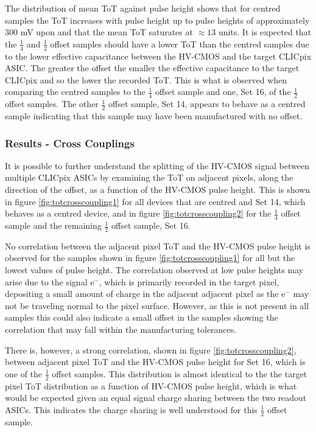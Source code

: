 The distribution of mean ToT against pulse height shows that for centred samples the ToT increases with pulse height up to pulse heights of approximately 300 mV upon and that the mean ToT saturates at $\approx 13$ units.  It is expected that the $\frac{1}{4}$ and $\frac{1}{2}$ offset samples should have a lower ToT than the centred samples due to the lower effective capacitance between the HV-CMOS and the target CLICpix ASIC.  The greater the offset the smaller the effective capacitance to the target CLICpix and so the lower the recorded ToT.  This is what is observed when comparing the centred samples to the $\frac{1}{4}$ offset sample and one, Set 16, of the $\frac{1}{2}$ offset samples.  The other $\frac{1}{2}$ offset sample, Set 14, appears to behave as a centred sample indicating that this sample may have been manufactured with no offset.  


\subsubsection{Results -  Cross Couplings}
It is possible to further understand the splitting of the HV-CMOS signal between multiple CLICpix ASICs by examining the ToT on adjacent pixels, along the direction of the offset, as a function of the HV-CMOS pulse height.  This is shown in figure \ref{fig:totcrosscoupling1} for all devices that are centred and Set 14, which behaves as a centred device, and in figure \ref{fig:totcrosscoupling2} for the $\frac{1}{4}$ offset sample and the remaining $\frac{1}{2}$ offset sample, Set 16.  

No correlation between the adjacent pixel ToT and the HV-CMOS pulse height is observed for the samples shown in figure \ref{fig:totcrosscoupling1} for all but the lowest values of pulse height.  The correlation observed at low pulse heights may arise due to the signal $\text{e}^{-}$, which is primarily recorded in the target pixel, depositing a small amount of charge in the adjacent adjacent pixel as the $\text{e}^{-}$ may not be traveling normal to the pixel surface.  However, as this is not present in all samples this could also indicate a small offset in the samples showing the correlation that may fall within the manufacturing tolerances.  

There is, however, a strong correlation, shown in figure \ref{fig:totcrosscoupling2}, between adjacent pixel ToT and the HV-CMOS pulse height for Set 16, which is one of the $\frac{1}{2}$ offset samples.  This distribution is almost identical to the the target pixel ToT distribution as a function of HV-CMOS pulse height, which is what would be expected given an equal signal charge sharing between the two readout ASICs.  This indicates the charge sharing is well understood for this $\frac{1}{2}$ offset sample.   

